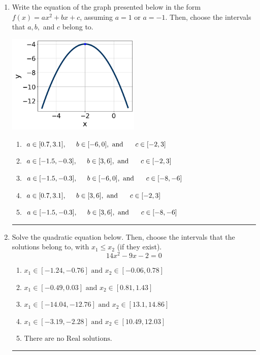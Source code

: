 \documentclass[14pt]{extbook}
\newcommand{\litem}[1]{\item#1\hspace*{-1cm}\rule{\textwidth}{0.4pt}}
\begin{document}
\begin{enumerate}
{\begin{enumerate}[label=\Alph*.]
\end{enumerate} }
\litem{
Write the equation of the graph presented below in the form $f(x)=ax^2+bx+c$, assuming  $a=1$ or $a=-1$. Then, choose the intervals that $a, b,$ and $c$ belong to.
\begin{center}
    \includegraphics[width=0.5\textwidth]{../Figures/quadraticGraphToEquationCopyB.png}
\end{center}
\begin{enumerate}[label=\Alph*.]
\item \( a \in [0.7, 3.1], \hspace*{5mm} b \in [-6, 0], \text{ and } \hspace*{5mm} c \in [-2, 3] \)
\item \( a \in [-1.5, -0.3], \hspace*{5mm} b \in [3, 6], \text{ and } \hspace*{5mm} c \in [-2, 3] \)
\item \( a \in [-1.5, -0.3], \hspace*{5mm} b \in [-6, 0], \text{ and } \hspace*{5mm} c \in [-8, -6] \)
\item \( a \in [0.7, 3.1], \hspace*{5mm} b \in [3, 6], \text{ and } \hspace*{5mm} c \in [-2, 3] \)
\item \( a \in [-1.5, -0.3], \hspace*{5mm} b \in [3, 6], \text{ and } \hspace*{5mm} c \in [-8, -6] \)

\end{enumerate} }
\litem{
Solve the quadratic equation below. Then, choose the intervals that the solutions belong to, with $x_1 \leq x_2$ (if they exist).\[ 14x^{2} -9 x -2 = 0 \]\begin{enumerate}[label=\Alph*.]
\item \( x_1 \in [-1.24, -0.76] \text{ and } x_2 \in [-0.06, 0.78] \)
\item \( x_1 \in [-0.49, 0.03] \text{ and } x_2 \in [0.81, 1.43] \)
\item \( x_1 \in [-14.04, -12.76] \text{ and } x_2 \in [13.1, 14.86] \)
\item \( x_1 \in [-3.19, -2.28] \text{ and } x_2 \in [10.49, 12.03] \)
\item \( \text{There are no Real solutions.} \)

\end{enumerate} }
\end{enumerate}
\end{document}
